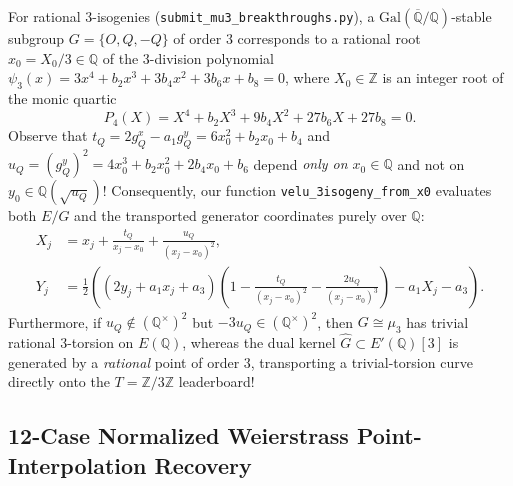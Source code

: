 \documentclass[10pt,a4paper]{article}
\theoremstyle{plain}
\theoremstyle{definition}
\theoremstyle{remark}
\begin{document}
For rational 3-isogenies (\texttt{submit\_mu3\_breakthroughs.py}), a $\mathrm{Gal}(\overline{\mathbb{Q}}/\mathbb{Q})$-stable subgroup $G = \{O, Q, -Q\}$ of order $3$ corresponds to a rational root $x_0 = X_0 / 3 \in \mathbb{Q}$ of the 3-division polynomial $\psi_3(x) = 3x^4 + b_2 x^3 + 3b_4 x^2 + 3b_6 x + b_8 = 0$, where $X_0 \in \mathbb{Z}$ is an integer root of the monic quartic
\begin{equation}
P_4(X) = X^4 + b_2 X^3 + 9b_4 X^2 + 27b_6 X + 27b_8 = 0.
\end{equation}
Observe that $t_Q = 2g_Q^x - a_1 g_Q^y = 6x_0^2 + b_2 x_0 + b_4$ and $u_Q = (g_Q^y)^2 = 4x_0^3 + b_2 x_0^2 + 2b_4 x_0 + b_6$ depend \emph{only on $x_0 \in \mathbb{Q}$} and not on $y_0 \in \mathbb{Q}(\sqrt{u_Q})$! Consequently, our function \texttt{velu\_3isogeny\_from\_x0} evaluates both $E/G$ and the transported generator coordinates purely over $\mathbb{Q}$:
\begin{equation}
\begin{aligned}
X_j &= x_j + \frac{t_Q}{x_j - x_0} + \frac{u_Q}{(x_j - x_0)^2}, \\
Y_j &= \frac{1}{2}\left((2y_j + a_1 x_j + a_3)\left(1 - \frac{t_Q}{(x_j - x_0)^2} - \frac{2u_Q}{(x_j - x_0)^3}\right) - a_1 X_j - a_3\right).
\end{aligned}
\end{equation}
Furthermore, if $u_Q \notin (\mathbb{Q}^\times)^2$ but $-3u_Q \in (\mathbb{Q}^\times)^2$, then $G \cong \mu_3$ has trivial rational 3-torsion on $E(\mathbb{Q})$, whereas the dual kernel $\hat{G} \subset E'(\mathbb{Q})[3]$ is generated by a \emph{rational} point of order $3$, transporting a trivial-torsion curve directly onto the $T = \mathbb{Z}/3\mathbb{Z}$ leaderboard!

\subsection{12-Case Normalized Weierstrass Point-Interpolation Recovery}
\end{document}
